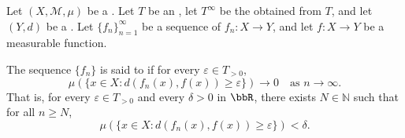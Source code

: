 \begin{definition} \label{definition:convergence_in_measure_for_a_sequence_of_measurable_functions_on_a_measure_space_into_an_extended_metric_space_valued_in_an_ordered_commutative_monoid_with_adjoined_infinity}
Let $(X, \mathcal{M}, \mu)$ be a . Let $T$ be an , let $T^\infty$ be the  obtained from $T$, and let $(Y, d)$ be a . Let $\{f_n\}_{n=1}^\infty$ be a sequence of  $f_n: X \to Y$, and let $f: X \to Y$ be a measurable function.

The sequence $\{f_n\}$ is said to  if for every $\varepsilon \in T_{>0}$,
$$\mu(\{x \in X : d(f_n(x), f(x)) \geq \varepsilon\}) \to 0 \quad \text{as } n \to \infty.$$
That is, for every $\varepsilon \in T_{>0}$ and every $\delta > 0$ in $\bbR$, there exists $N \in \mathbb{N}$ such that for all $n \geq N$,
$$\mu(\{x \in X : d(f_n(x), f(x)) \geq \varepsilon\}) < \delta.$$
\end{definition}